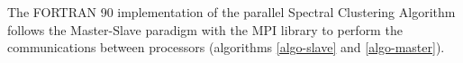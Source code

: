 \documentclass[]{svmult}
\begin{document}
The FORTRAN 90 implementation of the parallel Spectral Clustering Algorithm
follows the Master-Slave paradigm with the MPI library to perform the
communications between processors (algorithms \ref{algo-slave} and \ref{algo-master}).

\end{document}
